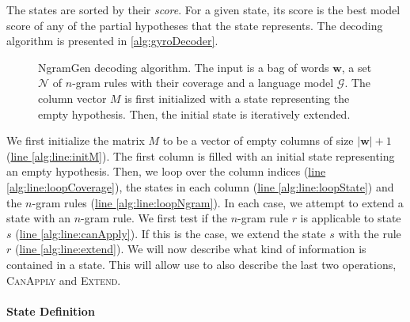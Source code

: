 The states are sorted by their \emph{score}.
For a given state, its score is the best model score of any of the partial
hypotheses that the state represents.
The decoding algorithm is presented in \autoref{alg:gyroDecoder}.
%
\begin{figure}
  \begin{algorithmic}[1]
       \hypertarget{alg:line:initM}{} \label{alg:line:initM}
       \hypertarget{alg:line:loopCoverage}{} \label{alg:line:loopCoverage}
         \hypertarget{alg:line:loopState}{} \label{alg:line:loopState}
           \hypertarget{alg:line:loopNgram}{} \label{alg:line:loopNgram}
             \hypertarget{alg:line:canApply}{} \label{alg:line:canApply}
               \hypertarget{alg:line:extend}{} \label{alg:line:extend}
            \EndIf
          \EndFor
        \EndFor
      \EndFor
    \EndFunction
  \end{algorithmic}
  \caption{NgramGen decoding algorithm. The input is a bag of words $\bm{w}$,
  a set $\mathcal{N}$ of $n$-gram rules with their coverage and a language model
  $\mathcal{G}$. The column vector $M$ is first initialized with a state representing
  the empty hypothesis. Then, the initial state is iteratively extended.}
  \label{alg:gyroDecoder}
\end{figure}
%
We first initialize the matrix $M$ to be a vector of empty
columns of size $|\bm{w}| + 1$ (\hyperlink{alg:line:initM}{line \ref{alg:line:initM}}).
The first column is filled with an initial state representing an empty hypothesis.
Then, we loop over the column indices
(\hyperlink{alg:line:initM}{line \ref{alg:line:loopCoverage}}), the states in each
column (\hyperlink{alg:line:loopState}{line \ref{alg:line:loopState}}) and the
$n$-gram rules (\hyperlink{alg:line:loopNgram}{line \ref{alg:line:loopNgram}}).
In each case, we attempt to extend a state with an $n$-gram rule. We first test
if the $n$-gram rule $r$ is applicable to state $s$
(\hyperlink{alg:line:canApply}{line \ref{alg:line:canApply}}). If this
is the case, we extend the state $s$ with the rule $r$
(\hyperlink{alg:line:extend}{line \ref{alg:line:extend}}).
We will now describe what kind of information is contained
in a state. This will allow use to also describe the last two operations, \textsc{CanApply}
and \textsc{Extend}.

\paragraph{State Definition}
\label{sec:gyroStateDefinition}

